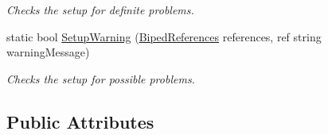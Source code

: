 \begin{DoxyCompactItemize}
\begin{DoxyCompactList}\small\item\em Checks the setup for definite problems. \end{DoxyCompactList}\item 
static bool \mbox{\hyperlink{class_root_motion_1_1_biped_references_a43eed3ca43bc5b7b4aff4631ddcbd650}{Setup\+Warning}} (\mbox{\hyperlink{class_root_motion_1_1_biped_references}{Biped\+References}} references, ref string warning\+Message)
\begin{DoxyCompactList}\small\item\em Checks the setup for possible problems. \end{DoxyCompactList}\end{DoxyCompactItemize}
\subsection*{Public Attributes}
